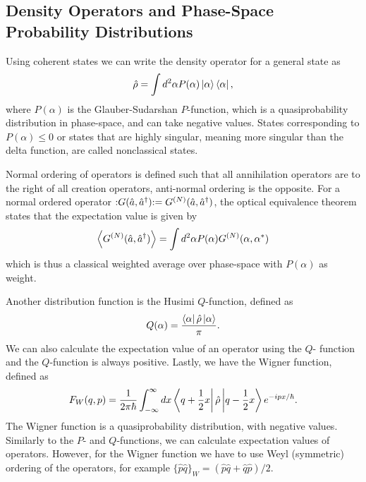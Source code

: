 \subsection{Density Operators and Phase-Space Probability Distributions}
Using coherent states we can write the density operator for a general state as
\begin{equation}
    \hat{\rho} = \int d^2\alpha P(\alpha) \ket{\alpha}\bra{\alpha},
\end{equation}
where $P(\alpha)$ is the Glauber-Sudarshan $P$-function, which is a quasiprobability distribution in phase-space, and can take negative values. States corresponding to $P(\alpha) \leq 0$ or states that are highly singular, meaning more singular than the delta function, are called nonclassical states. 

Normal ordering of operators is defined such that all annihilation operators are to the right of all creation operators, anti-normal ordering is the opposite. For a normal ordered operator $:\mathrel{G(\hat{a}, \hat{a}^\dagger)}: = G^{(N)}(\hat{a}, \hat{a}^\dagger)$, the optical equivalence theorem states that the expectation value is given by
\begin{equation}
    \expval{G^{(N)}(\hat{a}, \hat{a}^\dagger)} = \int d^2 \alpha P(\alpha) G^{(N)}(\alpha, \alpha^*)
\end{equation}
which is thus a classical weighted average over phase-space with $P(\alpha)$ as weight. 

Another distribution function is the Husimi $Q$-function, defined as
\begin{equation}
    Q(\alpha) = \frac{\bra{\alpha}\hat{\rho}\ket{\alpha}}{\pi}.
\end{equation}
We can also calculate the expectation value of an operator using the $Q$- function and the $Q$-function is always positive. Lastly, we have the Wigner function, defined as
\begin{equation}
    F_W (q, p) = \frac{1}{2\pi \hbar} \int_{-\infty}^{\infty} dx \bra{q + \frac{1}{2} x} \hat{\rho} \ket{q - \frac{1}{2} x} e^{-i p x/\hbar}.
\end{equation}
The Wigner function is a quasiprobability distribution, with negative values. Similarly to the $P$- and $Q$-functions, we can calculate expectation values of operators. However, for the Wigner function we have to use Weyl (symmetric) ordering of the operators, for example $\{\hat{p} \hat{q}\}_W = (\hat{p}\hat{q} + \hat{q}\hat{p})/2$.